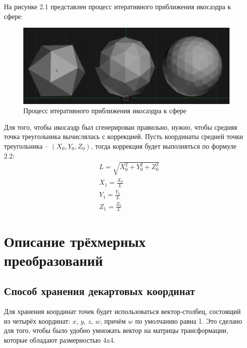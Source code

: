На рисунке 2.1 представлен процесс итеративного приближения икосаэдра к сфере:
\FloatBarrier
\begin{figure}[h]
	\begin{center}
		\includegraphics[width=\linewidth]{inc/ico.png}
	\end{center}
	\caption{Процесс итеративного приближения икосаэдра к сфере}
\end{figure}
\FloatBarrier

Для того, чтобы икосаэдр был сгенерирован правильно, нужно, чтобы средняя точка треугольника вычислялась с коррекцией. 
Пусть координаты средней точки треугольника – $(X_0, Y_0, Z_0)$, тогда коррекция будет выполняться по формуле 2.2:
	\begin{equation}
\begin{aligned}
& L = \sqrt{X_0^2 + Y_0^2 + Z_0^2} \\
& X_1 = \frac{X_0}{L} \\ 
& Y_1 = \frac{Y_0}{L} \\ 
& Z_1 = \frac{Z_0}{L}
\end{aligned}
\end{equation}

\section{Описание трёхмерных преобразований}

\subsection{Способ хранения декартовых координат}
Для хранения координат точек будет использоваться вектор-столбец, состоящий из четырёх координат: $ x $, $y $, $z$, $w$, причём $w$ по умолчанию равна 1. 
Это сделано для того, чтобы было удобно умножать вектор на матрицы трансформации, которые обладают размерностью 4x4.

